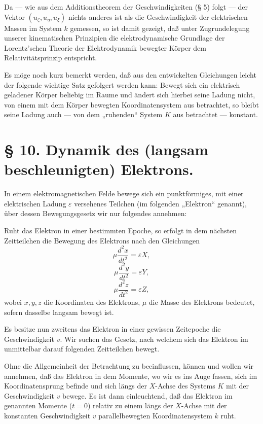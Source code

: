 \documentclass[17pt]{webarticle}       %
\begin{document}
Da — wie aus dem Additionstheorem der Geschwindigkeiten (§ 5) folgt — der Vektor \( (u_\zeta, u_\eta, u_\xi) \) nichts anderes ist als die Geschwindigkeit der elektrischen Massen im System \( k \) gemessen, so ist damit gezeigt, daß unter Zugrundelegung unserer kinematischen Prinzipien die elektrodynamische Grundlage der Lorentz'schen Theorie der Elektrodynamik bewegter Körper dem Relativitätsprinzip entspricht.

Es möge noch kurz bemerkt werden, daß aus den entwickelten Gleichungen leicht der folgende wichtige Satz gefolgert werden kann: Bewegt sich ein elektrisch geladener Körper beliebig im Raume und ändert sich hierbei seine Ladung nicht, von einem mit dem Körper bewegten Koordinatensystem aus betrachtet, so bleibt seine Ladung auch — von dem „ruhenden“ System \( K \) aus betrachtet — konstant.

\section*{§ 10. Dynamik des (langsam beschleunigten) Elektrons.}
In einem elektromagnetischen Felde bewege sich ein punktförmiges, mit einer elektrischen Ladung \( \varepsilon \) versehenes Teilchen (im folgenden „Elektron“ genannt), über dessen Bewegungsgesetz wir nur folgendes annehmen:

Ruht das Elektron in einer bestimmten Epoche, so erfolgt in dem nächsten Zeitteilchen die Bewegung des Elektrons nach den Gleichungen
\[
\mu \frac{d^2 x}{dt^2} = \varepsilon X,
\]
\[
\mu \frac{d^2 y}{dt^2} = \varepsilon Y,
\]
\[
\mu \frac{d^2 z}{dt^2} = \varepsilon Z,
\]
wobei \( x, y, z \) die Koordinaten des Elektrons, \( \mu \) die Masse des Elektrons bedeutet, sofern dasselbe langsam bewegt ist.

Es besitze nun zweitens das Elektron in einer gewissen Zeitepoche die Geschwindigkeit \( v \). Wir suchen das Gesetz, nach welchem sich das Elektron im unmittelbar darauf folgenden Zeitteilchen bewegt.

Ohne die Allgemeinheit der Betrachtung zu beeinflussen, können und wollen wir annehmen, daß das Elektron in dem Momente, wo wir es ins Auge fassen, sich im Koordinatensprung befinde und sich längs der \( X \)-Achse des Systems \( K \) mit der Geschwindigkeit \( v \) bewege. Es ist dann einleuchtend, daß das Elektron im genannten Momente (\( t = 0 \)) relativ zu einem längs der \( X \)-Achse mit der konstanten Geschwindigkeit \( v \) parallelbewegten Koordinatensystem \( k \) ruht.
\end{document}
